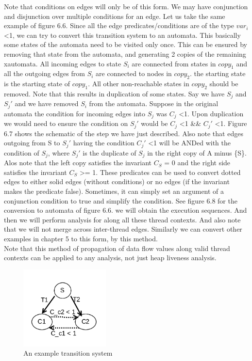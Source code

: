 Note that conditions on edges will only be of this form. We may have conjunction and disjunction over multiple conditions for an edge. Let us take the same example of figure 6.6. Since all the edge predicates/conditions are of the type $var_i$ \textless 1, we can try to convert this transition system to an automata. This basically some states of the automata need to be visited only once. This can be ensured by removing that state from the automata, and generating 2 copies of the remaining xautomata. All incoming edges to state $S_i$ are connected from states in $copy_1$ and all the outgoing edges from $S_i$ are connected to nodes in $copy_2$. the starting state is the starting state of $copy_1$. All other non-reachable states in $copy_2$ should be removed. Note that this results in duplication of some states. Say we have $S_j$ and $S_j'$ and we have removed $S_i$ from the automata. Suppose in the original automata the condition for incoming edges into $S_j$ was $C_j$ \textless 1. Upon duplication we would need to ensure the condition on $S_j'$ would be $C_j$ \textless 1 \&\& $C_j'$ \textless 1. Figure 6.7 shows the schematic of the step we have just described. Also note that edges outgoing from S to $S_j'$ having the condition $C_j'$ \textless 1 will be ANDed with the condition of $S_j$, where $S_j'$ is the duplicate of $S_j$ in the right copy of A minus \{S\}. Alos note that the left copy satisfies the invariant $C_S$ = 0 and the right side satisfies the invariant $C_S$ >= 1. These predicates can be used to convert dotted edges to either solid edges (without conditions) or no edges (if the invariant makes the predicate false). Sometimes, it can simply set an argument of a conjunction condition to true and simplify the condition. See figure 6.8 for the conversion to automata of figure 6.6. we will obtain the execution sequences. And then we will perform analysis for along all these thread contexts. And also note that we will not merge across inter-thread edges.  Similarly we can convert other examples in chapter 5 to this form, by this method. \\
   
Note that this method of propagation of data flow values along valid thread contexts can be applied to any analysis, not just heap liveness analysis.  

\begin{figure}
	\centering
	\includegraphics[width=0.4\textwidth]{Figures/automata_rep.png}
	\caption{An example transition system}
	\label{fig:ch5example}
\end{figure}


